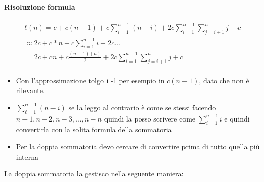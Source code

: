 \paragraph*{Risoluzione formula}
\begin{align*}
    t(n) = c + c(n-1) + c\sum_{i=1}^{n-1}(n-i) + 2c\sum_{i=1}^{n-1}\sum_{j=i+1}^n j + c\\
    \approx 2c+c*n+c\sum_{i=1}^{n-1}i+2c \dots =\\
    =2c+cn+c\frac{(n-1)(n)}{2} + 2c\sum_{i=1}^{n-1}\sum_{j=i+1}^n j + c\\
\end{align*}
\begin{itemize}
    \item Con l'approssimazione tolgo i -1 per esempio in $c(n-1)$, dato che non è rilevante.\\
    \item $\sum_{i=1}^{n-1}(n-i)$ se la leggo al contrario è come se stessi facendo \\
    $n-1, n-2, n-3, \dots, n-n$
    quindi la posso scrivere come $\sum_{i=1}^{n-1}i$ e quindi convertirla con la solita formula
    della sommatoria
    \item Per la doppia sommatoria devo cercare di convertire prima di tutto quella più interna
\end{itemize}
La doppia sommatoria la gestisco nella seguente maniera:

